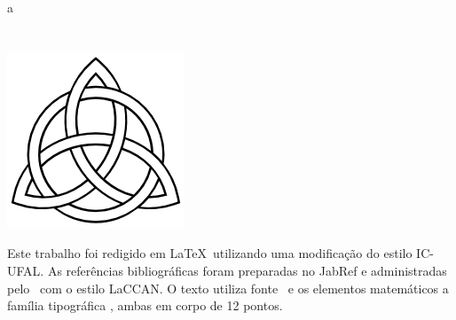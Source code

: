 a\documentclass[tcc]{ic}
\begin{document}
\chapter*{}
\vfill
\singlespacing
\thispagestyle{empty}
\begin{center}
\includegraphics[width=.3\textwidth]{./capitulos/figs/knot}

\vspace{.5cm}

Este trabalho foi redigido em {\large \LaTeX}\ utilizando uma modificação do estilo \textsf{IC-UFAL}.
As referências bibliográficas foram preparadas no \textsf{JabRef} e administradas pelo {\large\BibTeX}\ com o estilo \textsf{LaCCAN}.
O texto utiliza fonte \NomeFonte\ e os elementos matemáticos a família tipográfica \NomeFonteMat, ambas em corpo de 12 pontos.
\vspace{.5cm}
\end{center}
\end{document}
